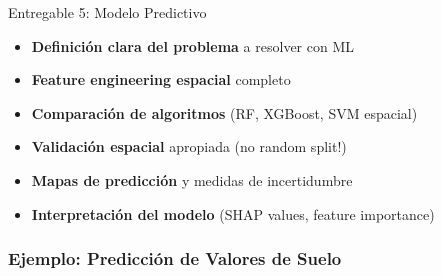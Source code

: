 \documentclass[12pt,a4paper]{article}
\begin{document}
\begin{deliverable}{Entregable 5: Modelo Predictivo}
\begin{itemize}
    \item \textbf{Definición clara del problema} a resolver con ML
    \item \textbf{Feature engineering espacial} completo
    \item \textbf{Comparación de algoritmos} (RF, XGBoost, SVM espacial)
    \item \textbf{Validación espacial} apropiada (no random split!)
    \item \textbf{Mapas de predicción} y medidas de incertidumbre
    \item \textbf{Interpretación del modelo} (SHAP values, feature importance)
\end{itemize}
\end{deliverable}

\subsubsection{Ejemplo: Predicción de Valores de Suelo}
\end{document}
